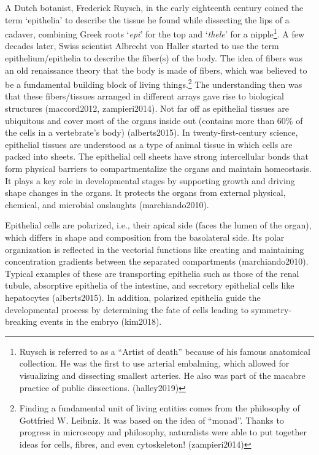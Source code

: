\documentclass[
]{article}
\begin{document}
A Dutch botanist, Frederick Ruysch, in the early eighteenth century
coined the term `epithelia' to describe the tissue he found while
dissecting the lips of a cadaver, combining Greek roots `\emph{epi}' for
the top and `\emph{thele}' for a nipple\footnote{Ruysch is referred to
  as a ``Artist of death'' because of his famous anatomical collection.
  He was the first to use arterial embalming, which allowed for
  visualizing and dissecting smallest arteries. He also was part of the
  macabre practice of public dissections. (halley2019)}. A few decades
later, Swiss scientist Albrecht von Haller started to use the term
epithelium/epithelia to describe the fiber(s) of the body. The idea of
fibers was an old renaissance theory that the body is made of fibers,
which was believed to be a fundamental building block of living
things.\footnote{Finding a fundamental unit of living entities comes
  from the philosophy of Gottfried W. Leibniz. It was based on the idea
  of ``monad''. Thanks to progress in microscopy and philosophy,
  naturalists were able to put together ideas for cells, fibres, and
  even cytoskeleton! (zampieri2014)} The understanding then was that
these fibers/tissues arranged in different arrays gave rise to
biological structures (maccord2012, zampieri2014). Not far off as
epithelial tissues are ubiquitous and cover most of the organs inside
out (contains more than 60\% of the cells in a vertebrate's body)
(alberts2015). In twenty-first-century science, epithelial tissues are
understood as a type of animal tissue in which cells are packed into
sheets. The epithelial cell sheets have strong intercellular bonds that
form physical barriers to compartmentalize the organs and maintain
homeostasis. It plays a key role in developmental stages by supporting
growth and driving shape changes in the organs. It protects the organs
from external physical, chemical, and microbial onslaughts
(marchiando2010).

Epithelial cells are polarized, i.e., their apical side (faces the lumen
of the organ), which differs in shape and composition from the
basolateral side. Its polar organization is reflected in the vectorial
functions like creating and maintaining concentration gradients between
the separated compartments (marchiando2010). Typical examples of these
are transporting epithelia such as those of the renal tubule, absorptive
epithelia of the intestine, and secretory epithelial cells like
hepatocytes (alberts2015). In addition, polarized epithelia guide the
developmental process by determining the fate of cells leading to
symmetry-breaking events in the embryo (kim2018).
\end{document}
